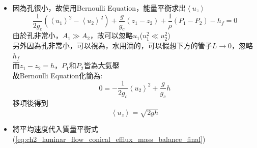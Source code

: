 \documentclass[../main.tex]{subfiles}
\begin{document}
\begin{itemize}
\begin{itemize}
    利用，將$r$表示成$h$的函數:
    \begin{equation}
      \frac{R_0}{r} = \frac{h_2}{h+h_2} \implies  r = R_0 \left(\frac{h+h_2}{h_2}\right) \label{eq:ch2_laminar_flow_conical_efflux_similar_triangle}
    \end{equation}
    代入質量平衡式(\ref{eq:ch2_laminar_flow_conical_efflux_mass_balance}):
    \begin{align}
      - \left<u_z\right> R_0^2 &= \frac{1}{3} \frac{d}{dt} \left[
        R_0^2 \left(\frac{h+h_2}{h_2}\right)^2 h - R_0^2 h_2
      \right] \nonumber\\
      &= \frac{R_0^2}{3} \frac{d}{dt} \left[
        \frac{(h+h_2)^2}{h_2^2} h - h_2
      \right] \nonumber\\
      &= \frac{R_0^2}{3} \frac{d}{dt} \left[
        \frac{h^3 + 2h_2 h^2 + h_2^2 h - h_2^3}{h_2^2}
      \right] \nonumber\\
      &= \frac{R_0^2}{3 h_2^2} \frac{d}{dt} \left[
        h^3 + 2h_2 h^2 + h_2^2 h - h_2^3
      \right] \nonumber\\
      &= \frac{R_0^2}{3 h_2^2} \left(
        3h^2 + 4h_2 h + h_2^2
      \right) \frac{dh}{dt} \label{eq:ch2_laminar_flow_conical_efflux_mass_balance_final}
    \end{align}
    \item 因為孔很小，故使用Bernoulli Equation，能量平衡求出$\left<u_z\right>$
    \begin{equation}
      \frac{1}{2g_c}\left(\left<u_1\right>^2-\left<u_2\right>^2\right) 
      + \frac{g}{g_c}\left(z_1-z_2\right) 
      + \frac{1}{\rho}\left(P_1-P_2\right) 
      - h_f =0
    \end{equation}
    由於孔非常小，$A_1 \gg A_2$，故可以忽略$u_1$($u_1^2\ll u_2^2$)\\
    另外因為孔非常小，可以視為，水用滴的，可以假想下方的管子$L\to 0$，忽略$h_f$\\
    而$z_1 -z_2 = h$，$P_1$和$P_2$皆為大氣壓\\
    故Bernoulli Equation化簡為:
    \begin{equation}
      0 = - \frac{1}{2g_c}\left<u_2\right>^2 
      + \frac{g}{g_c}h 
    \end{equation}
    移項後得到
    \begin{equation}
      \boxed{\left<u_z\right> = \sqrt{2gh}} \label{eq:ch2_laminar_flow_conical_efflux_velocity}
    \end{equation}
    \item 將平均速度代入質量平衡式(\ref{eq:ch2_laminar_flow_conical_efflux_mass_balance_final})

\end{itemize}
\end{itemize}
\end{document}
